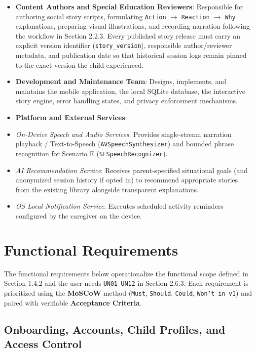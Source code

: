 \begin{itemize}
  \item \textbf{Content Authors and Special Education Reviewers}: Responsible for authoring social story scripts, formulating \texttt{Action} $\rightarrow$ \texttt{Reaction} $\rightarrow$ \texttt{Why} explanations, preparing visual illustrations, and recording narration following the workflow in Section 2.2.3. Every published story release must carry an explicit version identifier (\texttt{story\_version}), responsible author/reviewer metadata, and publication date so that historical session logs remain pinned to the exact version the child experienced.
  \item \textbf{Development and Maintenance Team}: Designs, implements, and maintains the mobile application, the local SQLite database, the interactive story engine, error handling states, and privacy enforcement mechanisms.
  \item \textbf{Platform and External Services}:
  \item \textit{On-Device Speech and Audio Services}: Provides single-stream narration playback / Text-to-Speech (\texttt{AVSpeechSynthesizer}) and bounded phrase recognition for Scenario E (\texttt{SFSpeechRecognizer}).
  \item \textit{AI Recommendation Service}: Receives parent-specified situational goals (and anonymized session history if opted in) to recommend appropriate stories from the existing library alongside transparent explanations.
  \item \textit{OS Local Notification Service}: Executes scheduled activity reminders configured by the caregiver on the device.
\end{itemize}



\section{Functional Requirements}


The functional requirements below operationalize the functional scope defined in Section 1.4.2 and the user needs \texttt{UN01}–\texttt{UN12} in Section 2.6.3. Each requirement is prioritized using the \textbf{MoSCoW} method (\texttt{Must}, \texttt{Should}, \texttt{Could}, \texttt{Won't in v1}) and paired with verifiable \textbf{Acceptance Criteria}.


\subsection{Onboarding, Accounts, Child Profiles, and Access Control}



